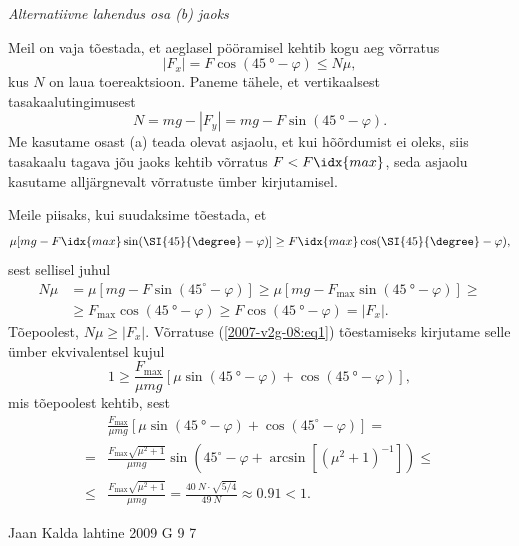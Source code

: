 \documentclass[11pt, twoside]{article}
\begin{document}
{{\vspace{0.5\baselineskip}

\emph{Alternatiivne lahendus osa (b) jaoks} 

Meil on vaja tõestada, et aeglasel pööramisel kehtib kogu aeg võrratus
\[
\left|F_{x}\right|=F \cos \left(\SI{45}{\degree}-\varphi\right) \leq N \mu,
\]
kus $N$ on laua toereaktsioon. Paneme tähele, et vertikaalsest tasakaalutingimusest
\[
N=m g-\left|F_{y}\right|=m g-F \sin \left(\SI{45}{\degree}-\varphi\right).
\]
Me kasutame osast (a) teada olevat asjaolu, et kui hõõrdumist ei oleks, siis tasakaalu tagava jõu jaoks kehtib võrratus $F < F\idx{max}$, seda asjaolu kasutame alljärgnevalt võrratuste ümber kirjutamisel.

Meile piisaks, kui suudaksime tõestada, et
\begin{equation}\label{2007-v2g-08:eq1}
\mu [mg - F\idx{max} \sin (\SI{45}{\degree} - \varphi )] \geq F\idx{max} \cos (\SI{45}{\degree} - \varphi ),
\end{equation}
sest sellisel juhul
\[
\begin{aligned}
N \mu &=\mu\left[m g-F \sin \left(45^{\circ}-\varphi\right)\right] \geq \mu\left[m g-F_{\max } \sin \left(\SI{45}{\degree}-\varphi\right)\right] \geq \\ & \geq F_{\max } \cos \left(\SI{45}{\degree}-\varphi\right) \geq F \cos \left(\SI{45}{\degree}-\varphi\right)=\left|F_{x}\right|.
\end{aligned}
\]
Tõepoolest, $N\mu \geq |F_x|$. Võrratuse (\ref{2007-v2g-08:eq1}) tõestamiseks kirjutame selle ümber ekvivalentsel kujul
\[
1 \geq \frac{F_{\max }}{\mu m g}\left[\mu \sin \left(\SI{45}{\degree}-\varphi\right)+\cos \left(\SI{45}{\degree}-\varphi\right)\right],
\]
mis tõepoolest kehtib, sest
\[
\begin{aligned} 
& \frac{F_{\max }}{\mu m g}\left[\mu \sin \left(\SI{45}{\degree}-\varphi\right)+\cos \left(45^{\circ}-\varphi\right)\right]=\\=& \frac{F_{\max } \sqrt{\mu^{2}+1}}{\mu m g} \sin \left(45^{\circ}-\varphi+\arcsin \left[\left(\mu^{2}+1\right)^{-1}\right]\right) \leq \\ \leq & \frac{F_{\max } \sqrt{\mu^{2}+1}}{\mu m g}=\frac{\SI{40}{N} \cdot \sqrt{5 / 4}}{\SI{49}{N}} \approx \num{0,91}<1. 
\end{aligned}
\]
\fi
}

{Jaan Kalda} %
{lahtine} %
{2009} %
{G 9} %
{7} %
{

}}
\end{document}
